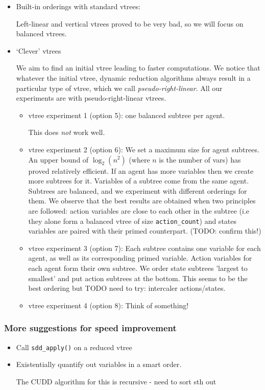 \documentclass[12]{article}
\begin{document}
\begin{itemize}

\item Built-in orderings with standard vtrees:

Left-linear and vertical vtrees proved to be very bad, so we will focus on balanced vtrees. 

\item `Clever' vtrees

We aim to find an initial vtree leading to faster computations. We notice that whatever the initial vtree, dynamic reduction algorithms always result in a particular type of vtree, which we call \textit{pseudo-right-linear}. 
All our experiments are with pseudo-right-linear vtrees.
\begin{itemize}
\item vtree experiment 1 (option 5): one balanced subtree per agent. 

This does \textit{not} work well.
\item vtree experiment 2 (option 6): We set a maximum size for agent subtrees. An upper bound of $\log_2(n^2)$ (where $n$ is the number of vars) has proved relatively efficient. If an agent has more variables then we create more subtrees for it. Variables of a subtree come from the same agent. Subtrees are balanced, and we experiment with different orderings for them. We observe that the best results are obtained when two principles are followed: action variables are close to each other in the subtree (i.e they alone form a balanced vtree of size \texttt{action\_count}) and states variables are 
paired with their primed counterpart. (TODO: confirm this!)

\item vtree experiment 3 (option 7): Each subtree contains one variable for each agent, as well as its corresponding primed variable. Action variables for each agent form their own subtree. We order state subtrees 'largest to smallest' and put action subtrees at the bottom. This seems to be the best ordering but TODO need to try: intercaler actions/states.

\item vtree experiment 4 (option 8): Think of something! 


\end{itemize}

\end{itemize}
\subsubsection{More suggestions for speed improvement} 
\begin{itemize}
\item Call \texttt{sdd\_apply()} on a reduced vtree
\item Existentially quantify out variables in a smart order.

The CUDD algorithm for this is recursive - need to sort sth out

\end{itemize}
\end{document}
